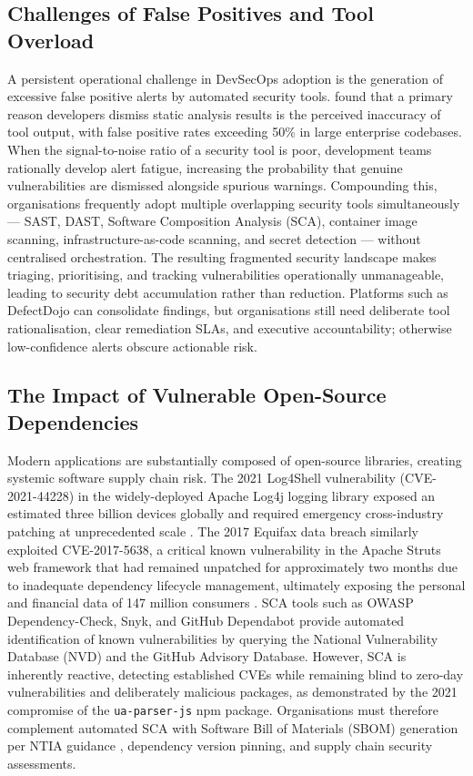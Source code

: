 \documentclass[12pt,a4paper]{article}
\begin{document}
\subsection*{Challenges of False Positives and Tool Overload}

A persistent operational challenge in DevSecOps adoption is the generation of excessive
false positive alerts by automated security tools. \citet{johnson2013} found that a primary
reason developers dismiss static analysis results is the perceived inaccuracy of tool
output, with false positive rates exceeding 50\% in large enterprise codebases. When the
signal-to-noise ratio of a security tool is poor, development teams rationally develop
alert fatigue, increasing the probability that genuine vulnerabilities are dismissed
alongside spurious warnings. Compounding this, organisations frequently adopt multiple
overlapping security tools simultaneously --- SAST, DAST, Software Composition Analysis
(SCA), container image scanning, infrastructure-as-code scanning, and secret detection ---
without centralised orchestration. The resulting fragmented security landscape makes
triaging, prioritising, and tracking vulnerabilities operationally unmanageable, leading to
security debt accumulation rather than reduction. Platforms such as DefectDojo can
consolidate findings, but organisations still need deliberate tool rationalisation, clear
remediation SLAs, and executive accountability; otherwise low-confidence alerts obscure
actionable risk.

\subsection*{The Impact of Vulnerable Open-Source Dependencies}

Modern applications are substantially composed of open-source libraries, creating systemic
software supply chain risk. The 2021 Log4Shell vulnerability (CVE-2021-44228) in the
widely-deployed Apache Log4j logging library exposed an estimated three billion devices
globally and required emergency cross-industry patching at unprecedented scale
\citep{chen2022}. The 2017 Equifax data breach similarly exploited CVE-2017-5638, a
critical known vulnerability in the Apache Struts web framework that had remained unpatched
for approximately two months due to inadequate dependency lifecycle management, ultimately
exposing the personal and financial data of 147 million consumers \citep{ftc2019}. SCA
tools such as OWASP Dependency-Check, Snyk, and GitHub Dependabot provide automated
identification of known vulnerabilities by querying the National Vulnerability Database
(NVD) and the GitHub Advisory Database. However, SCA is inherently reactive, detecting
established CVEs while remaining blind to zero-day vulnerabilities and deliberately
malicious packages, as demonstrated by the 2021 compromise of the \texttt{ua-parser-js}
npm package. Organisations must therefore complement automated SCA with Software Bill of
Materials (SBOM) generation per NTIA guidance \citep{ntia2021sbom}, dependency version
pinning, and supply chain security assessments.
\end{document}
